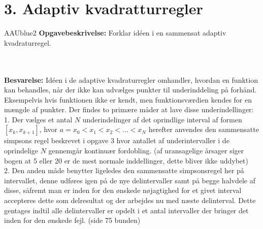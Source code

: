 \section*{3. Adaptiv kvadratturregler}
%
% 
%
\begin{color}{AAUblue2}
%
\textbf{Opgavebeskrivelse:} 
Forklar idéen i en sammensat adaptiv kvadraturregel.
% 
\end{color}
\\\\
% 
\textbf{Besvarelse:} 
Idéen i de adaptive kvadraturregler omhandler, hvordan en funktion kan behandles, når der ikke kan udvælges punkter til underinddeling på forhånd. Eksempelvis hvis funktionen ikke er kendt, men funktionsværdien kendes for en mængde af punkter.
Der findes to primære måder at lave disse underindellinger: \\
1. Der vælges et antal $N$ underindelinger af det oprindlige interval af formen $\left [  x_k, x_{k+1} \right ]$, hvor $a=x_0<x_1<x_2<\ldots<x_N$ herefter anvendes den sammensatte simpsons regel beskrevet i opgave 3 hvor antallet af underintervaller i de oprindelige $N$ gennemgår kontinuær fordobling.
(af uransagelige årsager siger bogen at 5 eller 20 er de mest normale inddellinger, dette bliver ikke uddybet) \\
2. Den anden måde benytter ligeledes den sammensatte simpsonsregel her på intervallet, denne udføres igen på de nye delintervaller samt på begge halvdele af disse, såfremt man er inden for den ønskede nøjagtighed for et givet interval accepteres dette som delresultat og der arbejdes nu med næste delinterval.
Dette gentages indtil alle delintervaller er opdelt i et antal intervaller der bringer det inden for den ønskede fejl.
(side 75 bunden)
%

